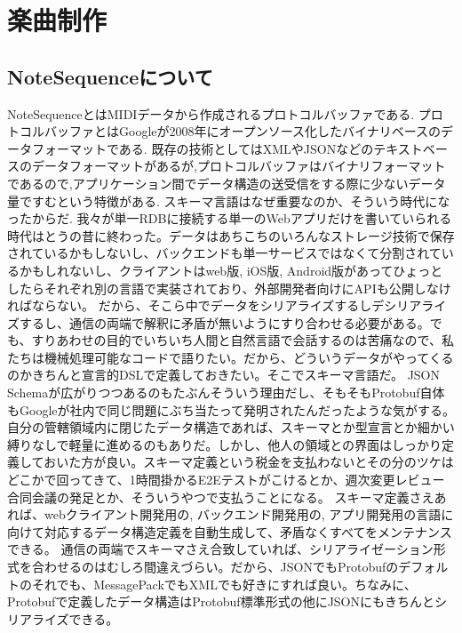 \chapter{楽曲制作}
\section{NoteSequenceについて}
NoteSequenceとはMIDIデータから作成されるプロトコルバッファである.
プロトコルバッファとはGoogleが2008年にオープンソース化したバイナリベースのデータフォーマットである.
既存の技術としてはXMLやJSONなどのテキストベースのデータフォーマットがあるが,プロトコルバッファはバイナリフォーマットであるので,アプリケーション間でデータ構造の送受信をする際に少ないデータ量ですむという特徴がある.
スキーマ言語はなぜ重要なのか、そういう時代になったからだ.
我々が単一RDBに接続する単一のWebアプリだけを書いていられる時代はとうの昔に終わった。データはあちこちのいろんなストレージ技術で保存されているかもしないし、バックエンドも単一サービスではなくて分割されているかもしれないし、クライアントはweb版, iOS版, Android版があってひょっとしたらそれぞれ別の言語で実装されており、外部開発者向けにAPIも公開しなければならない。
だから、そこら中でデータをシリアライズするしデシリアライズするし、通信の両端で解釈に矛盾が無いようにすり合わせる必要がある。でも、すりあわせの目的でいちいち人間と自然言語で会話するのは苦痛なので、私たちは機械処理可能なコードで語りたい。だから、どういうデータがやってくるのかきちんと宣言的DSLで定義しておきたい。そこでスキーマ言語だ。
JSON Schemaが広がりつつあるのもたぶんそういう理由だし、そもそもProtobuf自体もGoogleが社内で同じ問題にぶち当たって発明されたんだったような気がする。
自分の管轄領域内に閉じたデータ構造であれば、スキーマとか型宣言とか細かい縛りなしで軽量に進めるのもありだ。しかし、他人の領域との界面はしっかり定義しておいた方が良い。スキーマ定義という税金を支払わないとその分のツケはどこかで回ってきて、1時間掛かるE2Eテストがこけるとか、週次変更レビュー合同会議の発足とか、そういうやつで支払うことになる。
スキーマ定義さえあれば、webクライアント開発用の, バックエンド開発用の, アプリ開発用の言語に向けて対応するデータ構造定義を自動生成して、矛盾なくすべてをメンテナンスできる。
通信の両端でスキーマさえ合致していれば、シリアライゼーション形式を合わせるのはむしろ間違えづらい。だから、JSONでもProtobufのデフォルトのそれでも、MessagePackでもXMLでも好きにすれば良い。ちなみに、Protobufで定義したデータ構造はProtobuf標準形式の他にJSONにもきちんとシリアライズできる。
